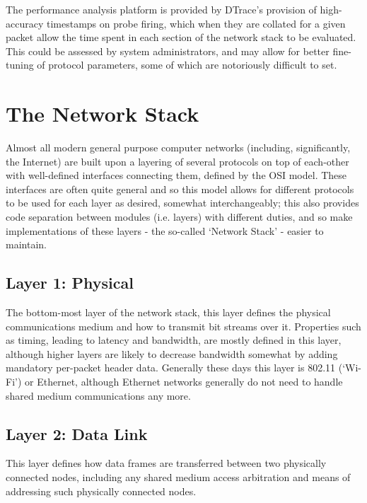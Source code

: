 \documentclass[a4paper,12pt,twoside,openright]{report}
\begin{document}
	The performance analysis platform is provided by DTrace's provision of high-accuracy timestamps on probe firing, which when they are collated for a given packet allow the time spent in each section of the network stack to be evaluated. This could be assessed by system administrators, and may allow for better fine-tuning of protocol parameters, some of which are notoriously difficult to set.
	
	\section{The Network Stack}
	
	Almost all modern general purpose computer networks (including, significantly, the Internet) are built upon a layering of several protocols on top of each-other with well-defined interfaces connecting them, defined by the OSI model\cite{ISO-OSI}. These interfaces are often quite general and so this model allows for different protocols to be used for each layer as desired, somewhat interchangeably; this also provides code separation between modules (i.e. layers) with different duties, and so make implementations of these layers - the so-called `Network Stack' - easier to maintain.
	
	\subsection{Layer 1: Physical}
	The bottom-most layer of the network stack, this layer defines the physical communications medium and how to transmit bit streams over it. Properties such as timing, leading to latency and bandwidth, are mostly defined in this layer, although higher layers are likely to decrease bandwidth somewhat by adding mandatory per-packet header data. Generally these days this layer is 802.11 (`Wi-Fi') or Ethernet, although Ethernet networks generally do not need to handle shared medium communications any more.
	
	\subsection{Layer 2: Data Link}
	This layer defines how data frames are transferred between two physically connected nodes, including any shared medium access arbitration and means of addressing such physically connected nodes.
	
\end{document}
